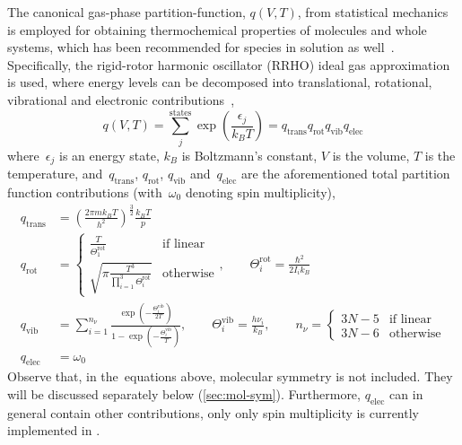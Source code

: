 The canonical gas-phase partition-function,
$q(V,
	T)$,
from statistical mechanics is employed for obtaining thermochemical properties of molecules and whole systems,
which has been recommended for species in solution as well~\cite{Ribeiro_2011}.
Specifically,
the rigid-rotor harmonic oscillator (RRHO) ideal gas approximation is used,
where energy levels can be decomposed into translational,
rotational,
vibrational and electronic contributions~\cite{McQuarrie_1997},
%
\begin{equation}
	q(V,
	T) = \sum_j^\text{states} \exp \left( \frac{\epsilon_j}{k_B T} \right)
	= q_\text{trans}
	q_\text{rot}
	q_\text{vib}
	q_\text{elec}
\end{equation}
%
where~$\epsilon_j$ is an energy state,
$k_B$ is Boltzmann's constant,
$V$ is the volume,
$T$ is the temperature,
and~$q_\text{trans}$,
$q_\text{rot}$,
$q_\text{vib}$ and~$q_\text{elec}$ are the aforementioned total partition function contributions (with~$\omega_0$ denoting spin multiplicity),
%
\begin{equation}
	\begin{split}
		q_\text{trans}
		&= \left(
		\frac{2 \pi m k_B T}{h^2}
		\right)^\frac{3}{2}
		\frac{k_B T}{p} \\
		q_\text{rot}
		&= \begin{cases}
			\frac{T}{\Theta^\text{rot}_1}
			 & \text{if linear} \\
			\sqrt{
				\pi
				\frac{T^3}{
					\prod_{i = 1}^{3} \Theta^\text{rot}_i
				}
			}
			 & \text{otherwise}
		\end{cases},
		\qquad
		\Theta^\text{rot}_i = \frac{\hbar^2}{2 I_i k_B} \\
		q_\text{vib}
		&= \sum_{i = 1}^{n_\nu}
		\frac{
			\exp\left(
			- \frac{\Theta^\text{vib}_i}{2 T}
			\right)
		}{
			1 - \exp\left(
			- \frac{\Theta^\text{vib}_i
			}{T}
			\right)
		},
		\qquad
		\Theta^\text{vib}_i = \frac{h \nu_i}{k_B},
		\qquad
		n_\nu = \begin{cases}
			3 N - 5 & \text{if linear} \\
			3 N - 6 & \text{otherwise}
		\end{cases}
		\\
		q_\text{elec}
		&= \omega_0
	\end{split}
\end{equation}
%
Observe that,
in the~equations above,
molecular symmetry is not included.
They will be discussed separately below (\cref{sec:mol-sym}).
Furthermore,
$q_\text{elec}$ can in general contain other contributions,
only only spin multiplicity is currently implemented in \overreact{}.

